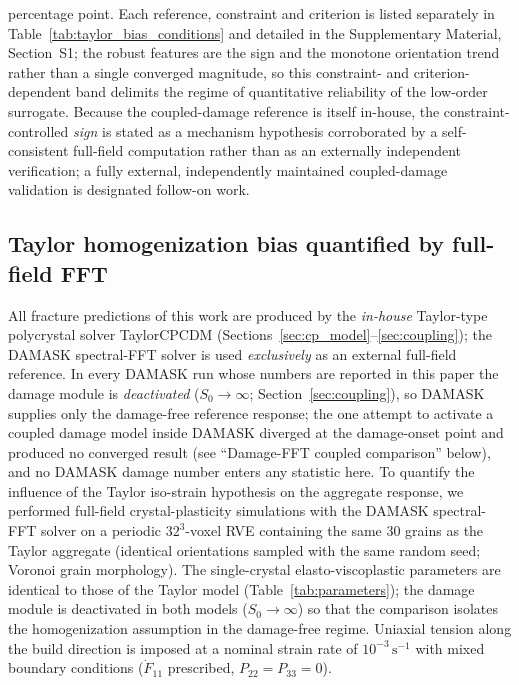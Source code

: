 \documentclass[twocolumn]{sagej}
\begin{document}
\begin{enumerate}
percentage point. Each reference, constraint and criterion is listed separately in Table~\ref{tab:taylor_bias_conditions} and detailed in the Supplementary Material, Section~S1; the robust features are the sign and the monotone orientation trend rather than a single converged magnitude, so this constraint- and criterion-dependent band delimits the regime of quantitative reliability of the low-order surrogate. Because the coupled-damage reference is itself in-house, the constraint-controlled \emph{sign} is stated as a mechanism hypothesis corroborated by a self-consistent full-field computation rather than as an externally independent verification; a fully external, independently maintained coupled-damage validation is designated follow-on work.
\end{enumerate}


\subsection{Taylor homogenization bias quantified by full-field FFT}
\label{sec:damask_fft}

All fracture predictions of this work are produced by the \emph{in-house} Taylor-type polycrystal solver TaylorCPCDM (Sections~\ref{sec:cp_model}--\ref{sec:coupling}); the DAMASK spectral-FFT solver is used \emph{exclusively} as an external full-field reference. In every DAMASK run whose numbers are reported in this paper the damage module is \emph{deactivated} ($S_0 \to \infty$; Section~\ref{sec:coupling}), so DAMASK supplies only the damage-free reference response; the one attempt to activate a coupled damage model inside DAMASK diverged at the damage-onset point and produced no converged result (see ``Damage-FFT coupled comparison'' below), and no DAMASK damage number enters any statistic here. To quantify the influence of the Taylor iso-strain hypothesis on the aggregate response, we performed full-field crystal-plasticity simulations with the DAMASK spectral-FFT solver \cite{roters2019damask,eisenlohr2013spectral} on a periodic $32^3$-voxel RVE containing the same 30 grains as the Taylor aggregate (identical orientations sampled with the same random seed; Voronoi grain morphology). The single-crystal elasto-viscoplastic parameters are identical to those of the Taylor model (Table~\ref{tab:parameters}); the damage module is deactivated in both models ($S_0\to\infty$) so that the comparison isolates the homogenization assumption in the damage-free regime. Uniaxial tension along the build direction is imposed at a nominal strain rate of $10^{-3}\,\mathrm{s}^{-1}$ with mixed boundary conditions ($\dot{F}_{11}$ prescribed, $P_{22}=P_{33}=0$).
\end{document}

